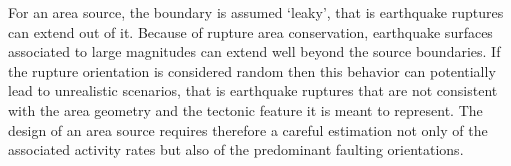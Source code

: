 For an area source, the boundary is assumed ‘leaky’, that is earthquake ruptures can extend out of it. Because of rupture area conservation, earthquake surfaces associated to large magnitudes can extend well beyond the source boundaries. If the rupture orientation is considered random then this behavior can potentially lead to unrealistic scenarios, that is earthquake ruptures that are not consistent with the area geometry and the tectonic feature it is meant to represent. The design of an area source requires therefore a careful estimation not only of the associated activity rates but also of the predominant faulting orientations.\\

%
%
%

%
%
%
%
%
%
